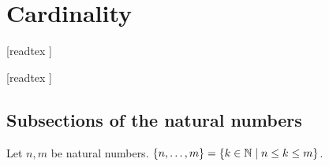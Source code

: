 \documentclass[../arithmetic.tex]{subfiles}
\begin{document}
  \chapter{Cardinality}\label{chapter:cardinality}


  \begin{forthel}

    [readtex ]

    [readtex ]

  \end{forthel}


  \section{Subsections of the natural numbers}

  \begin{forthel}
    \begin{definition}
      Let $n, m$ be natural numbers.
      $\{n,\dots,m\} = \{ k \in \mathbb{N} \mid n \leq k \leq m \}$.
    \end{definition}
  \end{forthel}
\end{document}

